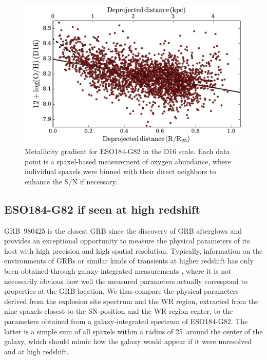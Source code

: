 \documentclass[traditabstract]{aa}
\begin{document}
\begin{figure}
\includegraphics[angle=0, width=0.99\columnwidth]{Figs/MUSE_SN1998bw_metgrad.pdf}
\caption{Metallicity gradient for ESO184-G82 in  the D16 scale. Each data point is a spaxel-based measurement of oxygen abundance, where individual spaxels were binned with their direct neighbors to enhance the S/N if necessary.}
\label{fig:metgrad}
\end{figure}

\subsection{ESO184-G82 if seen at high redshift}
\label{sec:int}

{GRB~980425 is the closest GRB since the discovery of GRB afterglows} and provides an exceptional opportunity to measure the physical parameters of its host with high precision and high spatial resolution. Typically, information on the environments of GRBs or similar kinds of transients at higher redshift has only been obtained through galaxy-integrated measurements \citep{2015A&A...581A.125K, 2016A&A...590A.129J, 2017A&A...599A.120V}, where it is not necessarily obvious how well the measured parameters actually correspond to properties at the GRB location. {We thus compare the physical parameters derived from the explosion site spectrum and the WR region, extracted from the nine spaxels closest to the SN position and the WR region center, to the parameters obtained from a galaxy-integrated spectrum of ESO184-G82. The latter is a simple sum of all spaxels within a radius of 25\arcsec\ around the center of the galaxy, which should mimic how the galaxy would appear if it were unresolved and at high redshift.}
\end{document}
